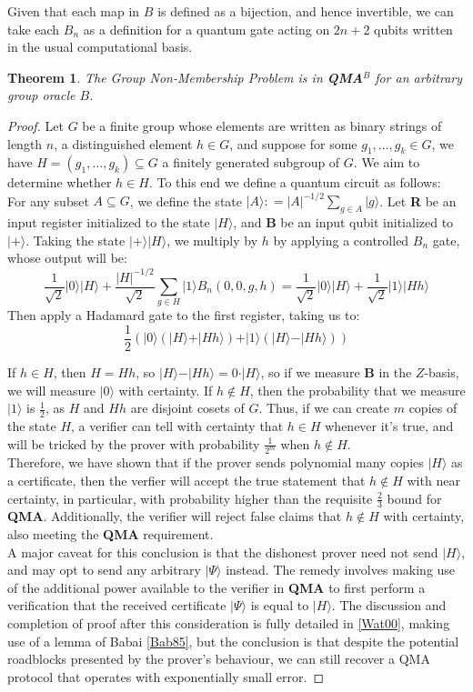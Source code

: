 \documentclass[12pt]{article}
\newtheorem{thm}{Theorem}
\numberwithin{thm}{section}
\numberwithin{defn}{section}
\numberwithin{prop}{section}
\numberwithin{rmk}{section}
\newcommand{\ket}[1]{\vert #1 \rangle}
\begin{document}
	Given that each map in $B$ is defined as a bijection, and hence invertible, we can take each $B_n$ as a definition for a quantum gate acting on $2n+2$ qubits written in the usual computational basis.
	\begin{thm}
		The Group Non-Membership Problem is in \textbf{QMA$^B$} for an arbitrary group oracle $B$.
	\end{thm}
	\begin{proof}
		Let $G$ be a finite group whose elements are written as binary strings of length $n$, a distinguished element $h\in G$, and suppose for some $g_1,\dots,g_k\in G$, we have $H=(g_1,\dots,g_k)\subseteq G$ a finitely generated subgroup of $G$. We aim to determine whether $h\in H$. To this end we define a quantum circuit as follows:\\
		
		 For any subset $A\subseteq G$, we define the state $\ket{A}\colon=|A|^{-1/2}\sum_{g\in A}\ket{g}$. Let \textbf{R} be an input register initialized to the state $\ket{H}$, and \textbf{B} be an input qubit initialized to $\ket{+}$. Taking the state $\ket{+}\ket{H}$, we multiply by $h$ by applying a controlled $B_n$ gate, whose output will be:
		 \[\frac{1}{\sqrt{2}}\ket{0}\ket{H}+\frac{|H|^{-1/2}}{\sqrt{2}}\sum_{g\in H}\ket{1}B_n(0,0,g,h)=\frac{1}{\sqrt{2}}\ket{0}\ket{H}+\frac{1}{\sqrt{2}}\ket{1}\ket{Hh}\]
		 Then apply a Hadamard gate to the first register, taking us to:
		 \[\frac{1}{2}(\ket{0}(\ket{H}+\ket{Hh})+\ket{1}(\ket{H}-\ket{Hh}))\]
		
		If $h\in H$, then $H=Hh$, so $\ket{H}-\ket{Hh}=0\cdot\ket{H}$, so if we measure \textbf{B} in the $Z$-basis, we will measure $\ket{0}$ with certainty. If $h\notin H$, then the probability that we measure $\ket{1}$ is $\frac{1}{2}$, as $H$ and $Hh$ are disjoint cosets of $G$. Thus, if we can create $m$ copies of the state $H$, a verifier can tell with certainty that $h\in H$ whenever it's true, and will be tricked by the prover with probability $\frac{1}{2^m}$ when $h\notin H$.\\
		
		Therefore, we have shown that if the prover sends polynomial many copies $\ket{H}$ as a certificate, then the verfier will accept the true statement that $h\notin H$ with near certainty, in particular, with probability higher than the requisite $\frac{2}{3}$ bound for \textbf{QMA}. Additionally, the verifier will reject false claims that $h\notin H$ with certainty, also meeting the \textbf{QMA} requirement. \\
		
		A major caveat for this conclusion is that the dishonest prover need not send $\ket{H}$, and may opt to send any arbitrary $\ket{\Psi}$ instead. The remedy involves making use of the additional power available to the verifier in \textbf{QMA} to first perform a verification that the received certificate $\ket{\Psi}$ is equal to $\ket{H}$. The discussion and completion of proof after this consideration is fully detailed in \hyperref[wat00]{[Wat00]}, making use of a lemma of Babai \hyperref[bab85]{[Bab85]}, but the conclusion is that despite the potential roadblocks presented by the prover's behaviour, we can still recover a QMA protocol that operates with exponentially small error.
	\end{proof}
\end{document}
